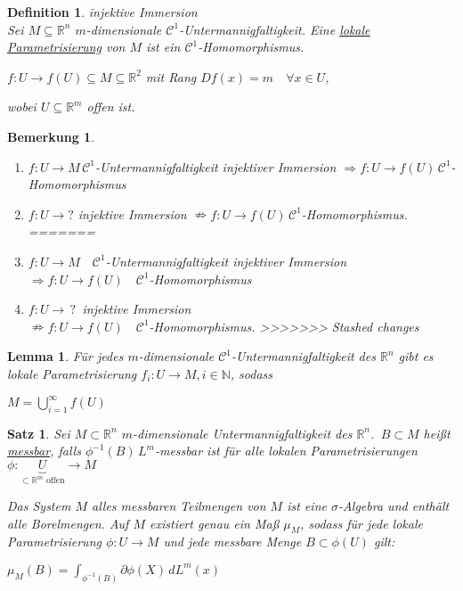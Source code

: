 \documentclass[11pt]{memoir}
\theoremstyle{changebreak}
\newtheorem{Definition}{Definition}[chapter]
\newtheorem{Bemerkung}{Bemerkung}[chapter]
\newtheorem{Lemma}{Lemma}[chapter]
\newtheorem{Satz}{Satz}[chapter]
\newcommand{\umgf}{$m$-dimensionale Untermannigfaltigkeit des $\mathbb R^n$}
\begin{document}
\begin{Definition}
\emph{injektive Immersion} \\
Sei $M \subseteq \mathbb R^n$ $m$-dimensionale $\mathscr C^1$-Untermannigfaltigkeit. Eine \underline{lokale Parametrisierung} von $M$ ist ein $\mathscr C^1$-Homomorphismus. 
\par\bigskip
$f: U \rightarrow f(U) \subseteq M \subseteq \mathbb R^2$ mit Rang $Df(x) = m \quad \forall x \in U$, 
\par
wobei $U \subseteq \mathbb R^m$ offen ist.
\end{Definition}

\begin{Bemerkung}
\begin{enumerate}
<<<<<<< Updated upstream
	\item $f: U \rightarrow M \, \mathscr C^1$-Untermannigfaltigkeit injektiver Immersion $\Rightarrow f:U \rightarrow f(U) \, \mathscr C^1$-Homomorphismus

	\item $f: U \rightarrow ?$ injektive Immersion $\nRightarrow f: U \rightarrow f(U) \, \mathscr C^1$-Homomorphismus.
=======
	\item $f: U \rightarrow M \quad \mathscr C^1$-Untermannigfaltigkeit injektiver Immersion \\
	$\Rightarrow f:U \rightarrow f(U) \quad \mathscr C^1$-Homomorphismus
	
	\item $f: U \rightarrow \,?\,$ injektive Immersion \\
	$\nRightarrow f: U \rightarrow f(U) \quad \mathscr C^1$-Homomorphismus.
>>>>>>> Stashed changes
\end{enumerate}
\end{Bemerkung}

\begin{Lemma}
Für jedes $m$-dimensionale $\mathscr C^1$-Untermannigfaltigkeit des $\mathbb R^n$ gibt es lokale Parametrisierung $f_i: U \rightarrow M, i \in \mathbb N$, sodass
\begin{center}
	$M = \bigcup\limits_{i=1}^\infty f(U)$
\end{center}
\end{Lemma}


\begin{Satz}
Sei $M \subset \mathbb R^n$ \umgf. \,$ B \subset M$ heißt \underline{messbar}, falls $\phi^{-1}(B) \, L^m$-messbar ist für alle lokalen Parametrisierungen \\
 $\phi: \underbrace{U}_{\subset \mathbb R^m \text{ offen}} \rightarrow M$  
 \par\bigskip
 Das System $M$ alles messbaren Teilmengen von $M$ ist eine $\sigma$-Algebra und enthält alle Borelmengen. Auf $M$ existiert genau ein Maß $\mu_M$, sodass für jede lokale Parametrisierung $\phi: U \rightarrow M$ und jede messbare Menge $B \subset \phi(U)$ gilt:
 \begin{center}
 	$\mu_M(B) = \int_{\phi^{-1}(B)} \partial \phi(X) \, d L^m(x)$
 \end{center}
\end{Satz}
\end{document}
